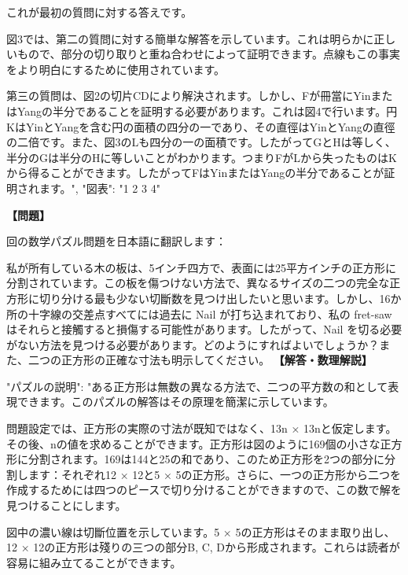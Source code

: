 \documentclass[10pt,a4paper,oneside,openany]{ltjsbook}
\begin{document}
\begin{tcolorbox}[colback=softblue,colframe=primaryblue,title=\textbf{第 158 問：THE GREAT MONAD.},arc=2mm,boxrule=1pt,breakable]
{これが最初の質問に対する答えです。

図3では、第二の質問に対する簡単な解答を示しています。これは明らかに正しいもので、部分の切り取りと重ね合わせによって証明できます。点線もこの事実をより明白にするために使用されています。

第三の質問は、図2の切片CDにより解決されます。しかし、Fが冊當にYinまたはYangの半分であることを証明する必要があります。これは図4で行います。円KはYinとYangを含む円の面積の四分の一であり、その直徑はYinとYangの直徑の二倍です。また、図3のLも四分の一の面積です。したがってGとHは等しく、半分のGは半分のHに等しいことがわかります。つまりFがLから失ったものはKから得ることができます。したがってFはYinまたはYangの半分であることが証明されます。",
"図表": "1 2 3 4"
}
\end{tcolorbox}

\begin{tcolorbox}[colback=softblue,colframe=primaryblue,title=\textbf{第 159 問：THE SQUARE OF VENEER.},arc=2mm,boxrule=1pt,breakable]
\textbf{【問題】}\par\vspace{0.3em}
回の数学パズル問題を日本語に翻訳します：

私が所有している木の板は、5インチ四方で、表面には25平方インチの正方形に分割されています。この板を傷つけない方法で、異なるサイズの二つの完全な正方形に切り分ける最も少ない切斷数を見つけ出したいと思います。しかし、16か所の十字線の交差点すべてには過去に Nail が打ち込まれており、私の fret-saw はそれらと接觸すると損傷する可能性があります。したがって、Nail を切る必要がない方法を見つける必要があります。どのようにすればよいでしょうか？また、二つの正方形の正確な寸法も明示してください。
\tcblower
\textbf{【解答・数理解説】}\par\vspace{0.3em}
{
  "パズルの説明": "ある正方形は無数の異なる方法で、二つの平方数の和として表現できます。このパズルの解答はその原理を簡潔に示しています。

問題設定では、正方形の実際の寸法が既知ではなく、13n × 13nと仮定します。その後、nの値を求めることができます。正方形は図のように169個の小さな正方形に分割されます。169は144と25の和であり、このため正方形を2つの部分に分割します：それぞれ12 × 12と5 × 5の正方形。さらに、一つの正方形から二つを作成するためには四つのピースで切り分けることができますので、この数で解を見つけることにします。

図中の濃い線は切斷位置を示しています。5 × 5の正方形はそのまま取り出し、12 × 12の正方形は殘りの三つの部分B, C, Dから形成されます。これらは読者が容易に組み立てることができます。

}
\end{tcolorbox}
\end{document}
